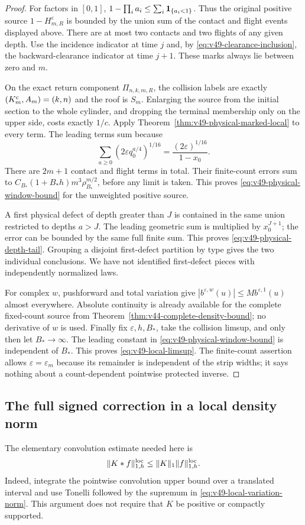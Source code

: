 \begin{proof}
For factors in $[0,1]$, $1-\prod_i a_i\le\sum_i\mathbf1_{\{a_i<1\}}$.
Thus the original positive source $1-H_{m,R}^\varepsilon$ is bounded
by the union sum of the contact and flight events displayed above.
There are at most two contacts and two flights of any given depth.
Use the incidence indicator at time $j$ and, by
\eqref{eq:v49-clearance-inclusion}, the backward-clearance indicator
at time $j+1$. These marks always lie between zero and $m$.

On the exact return component $\Pi_{n,k,m,R}$, the collision labels
are exactly $(K_m^{\rm c},A_m)=(k,n)$ and the roof is $S_m$.
Enlarging the source from the initial section to the whole cylinder,
and dropping the terminal membership only on the upper side, costs
exactly $1/c$. Apply Theorem~\ref{thm:v49-physical-marked-local} to
every term. The leading terms sum because
\[
 \sum_{a\ge0}(2\varepsilon q_0^{a/4})^{1/16}
                  =\frac{(2\varepsilon)^{1/16}}{1-x_0}.
\]
There are $2m+1$ contact and flight terms in total. Their finite-count
errors sum to $C_{B_*}(1+B_*h)m^3\rho_{B_*}^{m/2}$, before any
limit is taken. This proves \eqref{eq:v49-physical-window-bound}
for the unweighted positive source.

A first physical defect of depth greater than $J$ is contained in
the same union restricted to depths $a>J$. The leading geometric
sum is multiplied by $x_0^{J+1}$; the error can be bounded by the
same full finite sum. This proves \eqref{eq:v49-physical-depth-tail}.
Grouping a disjoint first-defect partition by type gives the two
individual conclusions. We have not identified first-defect pieces
with independently normalized laws.

For complex $w$, pushforward and total variation give
$|b^{\varepsilon,w}(u)|\le M b^{\varepsilon,1}(u)$ almost everywhere.
Absolute continuity is already available for the complete fixed-count
source from Theorem~\ref{thm:v44-complete-density-bound}; no derivative
of $w$ is used. Finally fix $\varepsilon,h,B_*$, take the collision
limsup, and only then let $B_*\to\infty$. The leading constant in
\eqref{eq:v49-physical-window-bound} is independent of $B_*$.
This proves \eqref{eq:v49-local-limsup}. The finite-count assertion
allows $\varepsilon=\varepsilon_m$ because its remainder is independent
of the strip widths; it says nothing about a count-dependent pointwise
protected inverse.
\end{proof}

\subsection{The full signed correction in a local density norm}
The elementary convolution estimate needed here is
\begin{equation}\label{eq:v49-convolution-local}
 \|K*f\|_{1,h}^{\rm loc}\le\|K\|_1\|f\|_{1,h}^{\rm loc}.
\end{equation}
Indeed, integrate the pointwise convolution upper bound over a
translated interval and use Tonelli followed by the supremum in
\eqref{eq:v49-local-variation-norm}. This argument does not require
that $K$ be positive or compactly supported.

